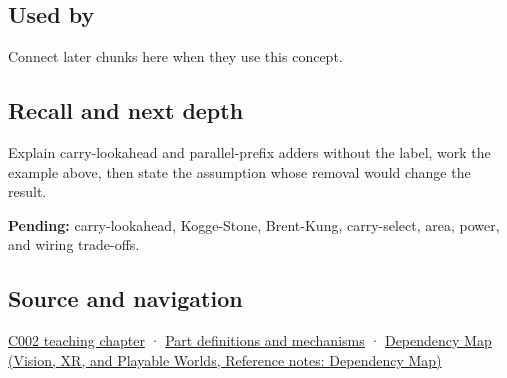 \subsection{Used by}\label{appendix-b5c46b2d94ff-used-by}

\hypertarget{appendix-b5c46b2d94ff-used-by}{}

Connect later chunks here when they use this concept.

\subsection{Recall and next depth}\label{appendix-b5c46b2d94ff-recall-and-next-depth}

\hypertarget{appendix-b5c46b2d94ff-recall-and-next-depth}{}

Explain carry-lookahead and parallel-prefix adders without the label, work the example above, then state the assumption whose removal would change the result.

\textbf{Pending:} carry-lookahead, Kogge-Stone, Brent-Kung, carry-select, area, power, and wiring trade-offs.

\subsection{Source and navigation}\label{appendix-b5c46b2d94ff-source-and-navigation}

\hypertarget{appendix-b5c46b2d94ff-source-and-navigation}{}

\hyperref[01-foundations-i-ch001-arithmetic-becomes-a-policy]{C002 teaching chapter} · \hyperref[appendix-fd090d982a15]{Part definitions and mechanisms} · \href{../07-Vision-XR-and-Playable-Worlds/main.pdf\#nameddest=appendix-4ad47bdd269a}{Dependency Map (Vision, XR, and Playable Worlds, Reference notes: Dependency Map)}
